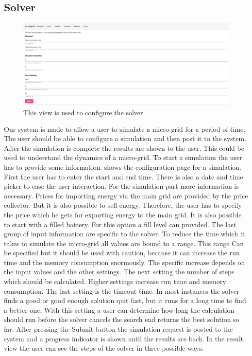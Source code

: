 \subsection{Solver}\label{sec:solver}
\begin{figure}[!h]
    \centering
\includegraphics[width=1.00\textwidth]{../figures/SolverSettings2Cut.png}
    \caption{This view is used to configure the solver}
    \label{fig:solverSettings}
\end{figure}
Our system is made to allow a user to simulate a micro-grid for a period of time. 
The user should be able to configure a simulation and then post it to the system. 
After the simulation is complete the results are shown to the user. This could be used to understand the dynamics of a micro-grid. To start a simulation the user has to provide some information.
 shows the configuration page for a simulation. 
First the user has to enter the start and end time. There is also a date and time picker to ease the user interaction. For the simulation part more information is necessary. Prices for importing energy via the main grid are provided by the price collector. But it is also possible to sell energy. Therefore, the user has to specify the price which he gets for exporting energy to the main grid. It is also possible to start with a filled battery. For this option a fill level can provided. The last group of input information are specific to the solver. To reduce the time which it takes to simulate the micro-grid all values are bound to a range. This range Can be specified but it should be used with caution, because it can increase the run time and the memory consumption enormously. The specific increase depends on the input values and the other settings. The next setting the number of steps which should be calculated. Higher settings increase run time and memory consumption. The last setting is the timeout time. In most instances the solver finds a good or good enough solution quit fast, but it runs for a long time to find a better one. With this setting a user can determine how long the calculation should run before the solver cancels the search end returns the best solution so far. After pressing the Submit button the simulation request is posted to the system and a progress indicator is shown until the results are back. In the result view the user can see the steps of the solver in three possible ways.
